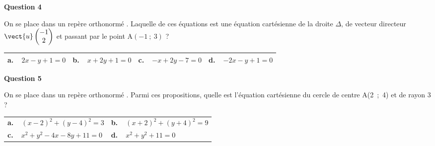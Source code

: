 \medskip

\textbf{Question 4}

\medskip

On se place dans un repère orthonormé \Oij. Laquelle de ces équations est une
équation cartésienne de la droite $\Delta$, de vecteur directeur $\vect{u}\begin{pmatrix}-1\\2\end{pmatrix}$ et passant par le point
A$(-1~;~3)$ ?

\begin{center}
\begin{tabularx}{\linewidth}{|*{4}{X|}}\hline
\textbf{a.~~}$2x - y + 1 = 0$&\textbf{b.~~}$x + 2y + 1 = 0$&\textbf{c.~~}$-x + 2y- 7= 0$&\textbf{d.~~}$-2x - y + 1 = 0$\\ \hline
\end{tabularx}
\end{center}

\medskip

\textbf{Question 5}

\medskip

On se place dans un repère orthonormé \Oij. Parmi ces propositions, quelle est l'équation cartésienne du cercle de centre A(2~;~4) et de rayon 3 ?

\begin{center}
\begin{tabularx}{\linewidth}{|*{2}{X|}}\hline
\textbf{a.~~}$(x- 2)^2+(y- 4)^2 = 3$&\textbf{b.~~}$(x+2)^2 + (y+4)^2 = 9$\\
\textbf{c.~~}$x^2 + y^2 - 4x - 8y+ 11 = 0$&\textbf{d.~~}$x^2 + y^2 + 11 = 0$\\ \hline
\end{tabularx}
\end{center}

\bigskip

